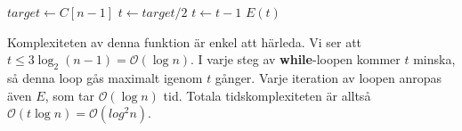 \documentclass[a4paper,titlepage]{article}
\renewcommand{\O}{\mathcal {O}}
\theoremstyle{definition}
\begin{document}
    \begin{algorithm}[H]
        \caption{$\O$}
        \begin{algorithmic}[1]
               \State $target \gets C[n-1] $
               \State $t \gets target/2 $
                \State $t \gets t-1$
                \EndWhile
                \State \Return $E(t)$
            \EndProcedure
        \end{algorithmic}
    \end{algorithm}
    
    Komplexiteten av denna funktion är enkel att härleda.
    Vi ser att $t\le3\log_2(n-1) = \O(\log n)$. I varje steg av
    \textbf{while}-loopen kommer $t$ minska, så denna loop gås maximalt igenom
    $t$ gånger. Varje iteration av loopen anropas även $E$, som tar $\O(\log n)$
    tid. Totala tidskomplexiteten är alltså $\O(t\log n) = \O(log^2 n)$.
\end{document}
